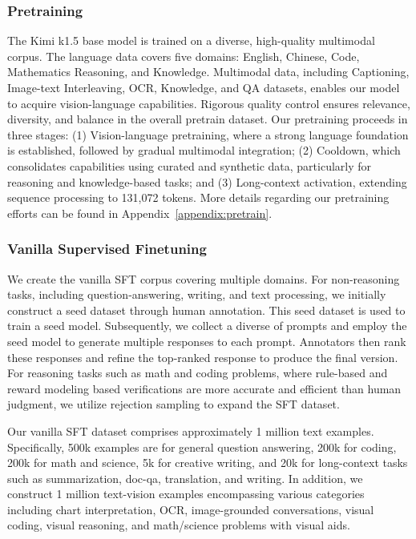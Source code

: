 \documentclass{article}
\begin{document}
\subsubsection{Pretraining}


The Kimi k1.5 base model is trained on a diverse, high-quality multimodal corpus. The language data covers five domains: English, Chinese, Code, Mathematics  Reasoning, and Knowledge. Multimodal data, including Captioning, Image-text Interleaving, OCR, Knowledge, and QA datasets, enables our model to acquire vision-language capabilities. Rigorous quality control ensures relevance, diversity, and balance in the overall pretrain dataset. Our pretraining proceeds in three stages: (1) Vision-language pretraining, where a strong language foundation is established, followed by gradual multimodal integration; (2) Cooldown, which consolidates capabilities using curated and synthetic data, particularly for reasoning and knowledge-based tasks; and (3) Long-context activation, extending sequence processing to 131,072 tokens. More details regarding our pretraining efforts can be found in Appendix~\ref{appendix:pretrain}. 



\subsubsection{Vanilla Supervised Finetuning}
\label{sec:vanilla_supervised_finetuning}
We create the vanilla SFT corpus covering multiple domains. For non-reasoning tasks, including question-answering, writing, and text processing, we initially construct a seed dataset through human annotation. This seed dataset is used to train a seed model. Subsequently, we collect a diverse of prompts and employ the seed model to generate multiple responses to each prompt. Annotators then rank these responses and refine the top-ranked response to produce the final version. For reasoning tasks such as math and coding problems, where rule-based and reward modeling based verifications are more accurate and efficient than human judgment, we utilize rejection sampling to expand the SFT dataset.

Our vanilla SFT dataset comprises approximately 1 million text examples. Specifically, 500k examples are for general question answering, 200k for coding, 200k for math and science, 5k for creative writing, and 20k for long-context tasks such as summarization, doc-qa, translation, and writing. In addition, we construct 1 million text-vision examples encompassing various categories including chart interpretation, OCR, image-grounded conversations, visual coding, visual reasoning, and math/science problems with visual aids. 
\end{document}
